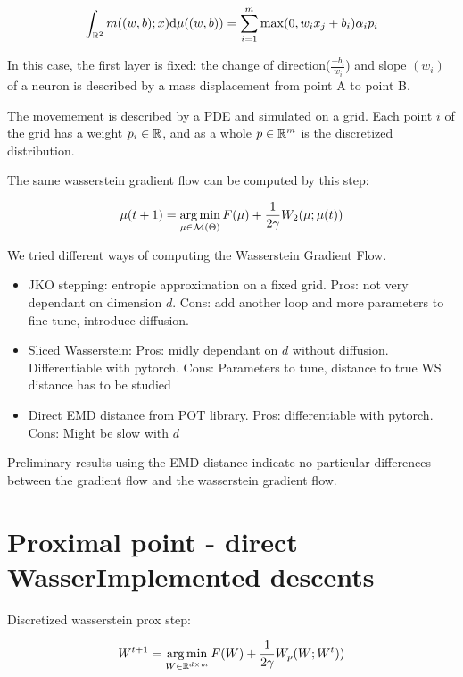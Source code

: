 \begin{equation}
	\int_{\mathbb{R}^2} m((w, b); x) \mathrm{d} \mu((w, b)) = \sum_{i=1}^{m} \max(0, w_i x_j + b_i) \alpha_i p_i
\end{equation}

In this case, the first layer is fixed: the change of direction($\frac{-b_i}{w_i}$) and slope $(w_i)$ of a neuron is described by a mass displacement from point A to point B. 

The movemement is described by a PDE and simulated on a grid. Each point $i$ of the grid has a weight $p_i \in \mathbb{R}$, and as a whole $p \in \mathbb{R}^m$ is the discretized distribution.

The same wasserstein gradient flow can be computed by this step:

\begin{equation}
	\mu(t+1) = \operatorname*{arg\,min}_{\mu \in \mathcal{M}(\Theta)} F(\mu) + \frac{1}{2 \gamma} W_2(\mu; \mu(t))
\end{equation}

We tried different ways of computing the Wasserstein Gradient Flow. 

\begin{itemize}
	\item JKO stepping: entropic approximation on a fixed grid. Pros: not very dependant on dimension $d$. Cons: add another loop and more parameters to fine tune, introduce diffusion.
		\item Sliced Wasserstein: Pros: midly dependant on $d$ without diffusion. Differentiable with pytorch. Cons: Parameters to tune, distance to true WS distance has to be studied
		\item Direct EMD distance from POT library. Pros: differentiable with pytorch. Cons: Might be slow with $d$
\end{itemize}

Preliminary results using the EMD distance indicate no particular differences between the gradient flow and the wasserstein gradient flow.

\section{Proximal point - direct WasserImplemented descents}

Discretized wasserstein prox step:

\begin{equation}
	W^{t+1} = \operatorname*{arg\,min}_{W \in \mathbb{R}^{d \times m}} F(W) + \frac{1}{2 \gamma} W_p(W; W^t))
\end{equation}


